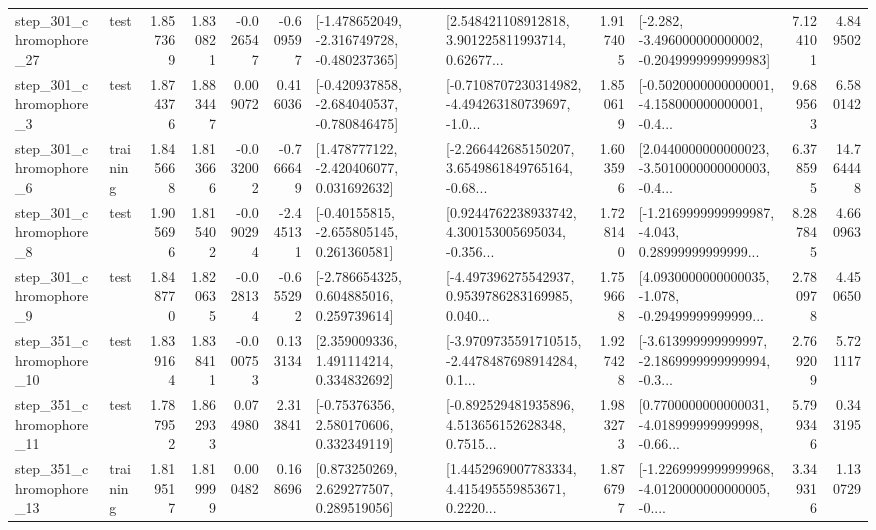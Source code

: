 \begin{tabular}{llrrrrllrlrr}
  step\_301\_chromophore\_27 &      test &      1.857369 &    1.830821 &     -0.026547 & -0.609597 &  [-1.478652049, -2.316749728, -0.480237365] &  [2.548421108912818, 3.901225811993714, 0.62677... &       1.917405 &  [-2.282, -3.496000000000002, -0.2049999999999983] &            7.124101 &          4.849502 \\
   step\_301\_chromophore\_3 &      test &      1.874376 &    1.883447 &      0.009072 &  0.416036 &  [-0.420937858, -2.684040537, -0.780846475] &  [-0.7108707230314982, -4.494263180739697, -1.0... &       1.850619 &  [-0.5020000000000001, -4.158000000000001, -0.4... &            9.689563 &          6.580142 \\
   step\_301\_chromophore\_6 &  training &      1.845668 &    1.813666 &     -0.032002 & -0.766649 &    [1.478777122, -2.420406077, 0.031692632] &  [-2.266442685150207, 3.6549861849765164, -0.68... &       1.603596 &  [2.0440000000000023, -3.5010000000000003, -0.4... &            6.378595 &         14.764448 \\
   step\_301\_chromophore\_8 &      test &      1.905696 &    1.815402 &     -0.090294 & -2.445131 &    [-0.40155815, -2.655805145, 0.261360581] &  [0.9244762238933742, 4.300153005695034, -0.356... &       1.728140 &  [-1.2169999999999987, -4.043, 0.28999999999999... &            8.287845 &          4.660963 \\
   step\_301\_chromophore\_9 &      test &      1.848770 &    1.820635 &     -0.028134 & -0.655292 &    [-2.786654325, 0.604885016, 0.259739614] &  [-4.497396275542937, 0.9539786283169985, 0.040... &       1.759668 &  [4.0930000000000035, -1.078, -0.29499999999999... &            2.780978 &          4.450650 \\
  step\_351\_chromophore\_10 &      test &      1.839164 &    1.838411 &     -0.000753 &  0.133134 &     [2.359009336, 1.491114214, 0.334832692] &  [-3.9709735591710515, -2.4478487698914284, 0.1... &       1.927428 &  [-3.613999999999997, -2.1869999999999994, -0.3... &            2.769209 &          5.721117 \\
  step\_351\_chromophore\_11 &      test &      1.787952 &    1.862933 &      0.074980 &  2.313841 &     [-0.75376356, 2.580170606, 0.332349119] &  [-0.892529481935896, 4.513656152628348, 0.7515... &       1.983273 &  [0.7700000000000031, -4.018999999999998, -0.66... &            5.799346 &          0.343195 \\
  step\_351\_chromophore\_13 &  training &      1.819517 &    1.819999 &      0.000482 &  0.168696 &     [0.873250269, 2.629277507, 0.289519056] &  [1.4452969007783334, 4.415495559853671, 0.2220... &       1.876797 &  [-1.2269999999999968, -4.0120000000000005, -0.... &            3.349316 &          1.130729 \\

\end{tabular}
